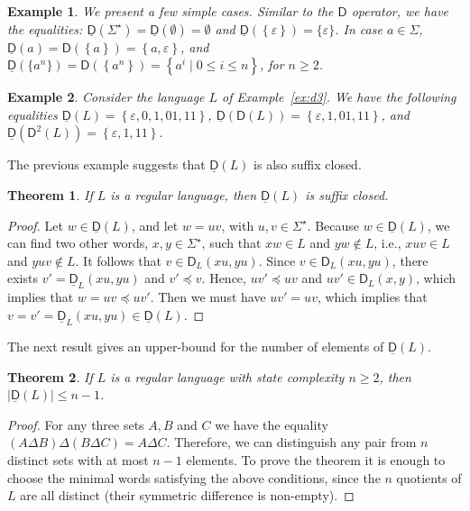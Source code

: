 \documentclass{article}
\newtheorem{theorem}{Theorem}
\newtheorem{example}{Example}
\newcommand{\disw}[2]{\mathsf{D}_{#1}(#2)}
\newcommand{\dis}[1]{\mathsf{D}(#1)}
\newcommand{\diso}{\mathsf{D}}
\newcommand{\disn}[2]{\mathsf{D}^{#2}(#1)}
\newcommand{\distminw}[2]{\underline{\mathsf{D}}_{#1}(#2)}
\newcommand{\distmin}[1]{\underline{\mathsf{D}}(#1)}
\newcommand{\Set}[1]{\left\{ #1 \right\}}
\newcommand{\kleene}[1]{#1^\star}
\begin{document}
\begin{example}
\label{ex:dismt} We present a few simple cases. Similar to the $\diso$ operator, 
we have the equalities:
$\distmin{\kleene{\Sigma}}=\distmin{\emptyset}=
\emptyset$ and $\distmin{\Set{\varepsilon}}=\{\varepsilon\}$. 
In case $a\in \Sigma$, $\distmin{a}=\dis{\Set{a}}=\Set{a,\varepsilon}$, and 
 $\distmin{\{a^n\}}=\dis{\Set{a^n}}=\Set{ a^i\mid 0\leq i\leq n}$, for $n\ge 2$.
\end{example}

\begin{example}
  \label{ex:dmin}
  Consider the language $L$ of Example~\ref{ex:d3}. 
We have the following equalities
$\distmin{L}=\Set{\varepsilon,0,1,01,11}$, 
$\distmin{\dis{L}}=\Set{\varepsilon,1,01,11}$, and  
$\distmin{\disn{L}{2}}=\Set{\varepsilon,1,11}$.
\end{example}

The previous example suggests that $\distmin{L}$ is also suffix closed.
   
\begin{theorem}
\label{theo:mindist_is_suffix_closed}
If $L$ is a regular language, then $\distmin{L}$ is suffix closed.
\end{theorem}
\begin{proof}
  Let $w\in \distmin{L}$, and let $w=uv$, with $u,v\in\kleene{\Sigma}$. 
Because $w\in \distmin{L}$,
  we can find two other words, $x,y\in \Sigma^\star$, such that
$xw\in L$ and $yw\notin L$, i.e.,
$xuv\in L$ and $yuv\notin L$. 
It follows that $v\in \disw{L}{xu,yu}$.
Since $v\in \disw{L}{xu,yu}$,  there exists 
$v'=\distminw{L}{xu,yu}$ and $v'\preceq v$.
Hence, $uv'\preceq uv$ and $uv'\in \disw{L}{x,y}$, which implies that 
$w=uv\preceq uv'$. Then we must have $uv'=uv$, which implies that  
$v=v'= \distminw{L}{xu,yu}\in  \distmin{L}$. 
\end{proof}

The next result gives an upper-bound for the number of elements of $\distmin{L}$.

\begin{theorem}
\label{theo:mindist_upp_bound_set}
If $L$ is a regular language with state complexity $n\geq 2$, 
then $|\distmin{L}|\leq n-1$.
\end{theorem}
\begin{proof}
For any three sets $A, B$ and $C$ we have the equality $(A\Delta B)\Delta(B\Delta C) = A\Delta C$.
Therefore, we can distinguish any pair from $n$ distinct sets with at most $n-1$ elements. 
To prove the theorem it is enough to choose the minimal words satisfying the above conditions,
 since the $n$ quotients of $L$ are all distinct (their symmetric difference is non-empty). 
\end{proof}
\end{document}
